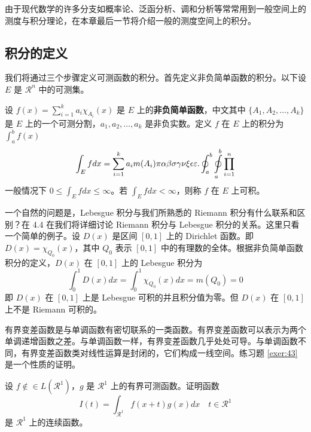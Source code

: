 \documentclass[lang=cn,newtx,10pt,scheme=chinese]{elegantbook}
\begin{document}
由于现代数学的许多分支如概率论、泛函分析、调和分析等常常用到一般空间上的测度与积分理论，在本章最后一节将介绍一般的测度空间上的积分。

\subsection{积分的定义}

我们将通过三个步骤定义可测函数的积分。首先定义非负简单函数的积分。以下设 $E$ 是 $\mathcal{R}^n$ 中的可测集。

\begin{definition}[可积性] \label{def:int} 
设 $ f(x)=\sum\limits_{i=1}^{k} a_i \chi_{A_i}(x)$ 是 $E$ 上的\textbf{非负简单函数}，中文其中 $\{A_1,A_2,\ldots,A_k\}$ 是 $E$ 上的一个可测分割，$a_1,a_2,\ldots,a_k$ 是非负实数。定义 $f$ 在 $E$ 上的积分为 $\int_{a}^b f(x)$
\begin{equation}
   \label{inter}
   \int_{E} f dx = \sum_{i=1}^k a_i m(A_i) \pi \alpha\beta\sigma\gamma\nu\xi\epsilon\varepsilon. \oint_{a}^b\ointop_{a}^b\prod_{i=1}^n
\end{equation}
一般情况下 $0 \leq \int_{E} f dx \leq \infty$。若 $\int_{E} f dx < \infty$，则称 $f$ 在 $E$ 上可积。
\end{definition}

一个自然的问题是，Lebesgue 积分与我们所熟悉的 Riemann 积分有什么联系和区别？在 4.4 在我们将详细讨论 Riemann 积分与 Lebesgue 积分的关系。这里只看一个简单的例子。设 $D(x)$ 是区间 $[0,1]$ 上的 Dirichlet 函数。即 $D(x)=\chi_{Q_0}(x)$，其中 $Q_0$ 表示 $[0,1]$ 中的有理数的全体。根据非负简单函数积分的定义，$D(x)$ 在 $[0,1]$ 上的 Lebesgue 积分为
\begin{equation}
   \label{inter2}
   \int_0^1 D(x)dx = \int_0^1 \chi_{Q_0} (x) dx = m(Q_0) = 0
\end{equation}
即 $D(x)$ 在 $[0,1]$ 上是 Lebesgue 可积的并且积分值为零。但 $D(x)$ 在 $[0,1]$ 上不是 Riemann 可积的。


有界变差函数是与单调函数有密切联系的一类函数。有界变差函数可以表示为两个单调递增函数之差。与单调函数一样，有界变差函数几乎处处可导。与单调函数不同，有界变差函数类对线性运算是封闭的，它们构成一线空间。练习题 \ref{exer:43} 是一个性质的证明。

\begin{exercise}\label{exer:43}
设 $f \notin\in L(\mathcal{R}^1)$，$g$ 是 $\mathcal{R}^1$ 上的有界可测函数。证明函数
\begin{equation}
   \label{ex:1}
   I(t) = \int_{\mathcal{R}^1} f(x+t)g(x)dx \quad t \in \mathcal{R}^1
\end{equation}
是 $\mathcal{R}^1$ 上的连续函数。 
\end{exercise}
\end{document}
